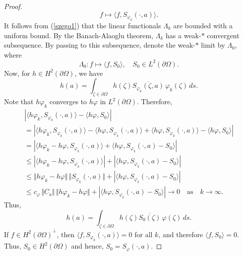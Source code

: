 \documentclass[11pt, reqno]{amsart}
\numberwithin{equation}{section}
\begin{document}
\begin{proof}
\[
f\mapsto \langle f, S_{\varphi_k}(\cdot,a)\rangle.
\]
It follows from (\ref{szego1}) that the linear functionals $\Lambda_k$ are bounded with a uniform bound. By the Banach-Alaoglu theorem, $\Lambda_k$ has a weak-${*}$ convergent subsequence. By passing to this subsequence, denote the weak-${*}$ limit by $\Lambda_0$, where 
\[
\Lambda_0: f\mapsto \langle f, S_0\rangle,\quad S_0\in L^2(\partial\Omega).
\]
Now, for $h\in H^2(\partial\Omega)$, we have
\[
h(a)=\int_{\zeta\in\partial\Omega} h(\zeta) \overline{S_{\varphi_k}(\zeta,a)}\,\varphi_k(\zeta)\,ds.
\]
Note that $h\varphi_k$ converges to $h\varphi$ in $L^2(\partial\Omega)$. Therefore,
\begin{multline*}
\left\lvert\langle h\varphi_k,S_{\varphi_k}(\cdot,a)\rangle-\langle h\varphi, S_0\rangle\right\rvert \\
= \left\lvert\langle h\varphi_k,S_{\varphi_k}(\cdot,a)\rangle-\langle h\varphi, S_{\varphi_k}(\cdot,a)\rangle+
\langle h\varphi, S_{\varphi_k}(\cdot,a)\rangle-\langle h\varphi, S_0\rangle\right\rvert\\
= \left\lvert\langle h\varphi_k-h\varphi, S_{\varphi_k}(\cdot,a)\rangle + \langle h\varphi,S_{\varphi_k}(\cdot,a)-S_0\rangle\right\rvert\\
\leq \left\lvert\langle h\varphi_k-h\varphi, S_{\varphi_k}(\cdot,a)\rangle\right\rvert + \left\lvert\langle h\varphi,S_{\varphi_k}(\cdot,a)-S_0\rangle\right\rvert\\
\leq \Vert h\varphi_k-h\varphi\Vert\,\Vert S_{\varphi_k}(\cdot,a)\Vert + \left\lvert\langle h\varphi,S_{\varphi_k}(\cdot,a)-S_0\rangle\right\rvert\\
\leq c_{\varphi}\,\Vert C_a\Vert\,\Vert h\varphi_k-h\varphi\Vert + \left\lvert\langle h\varphi,S_{\varphi_k}(\cdot,a)-S_0\rangle\right\rvert \rightarrow 0 \quad \text{as}\quad k\rightarrow\infty.
\end{multline*}
Thus,
\[
h(a)=\int_{\zeta\in\partial\Omega} h(\zeta) \overline{S_0(\zeta)}\,\varphi(\zeta)\,ds.
\]
If $f\in {H^2(\partial\Omega)}^{\perp}$, then $\langle f, S_{\varphi_k}(\cdot,a)\rangle=0$ for all $k$, and therefore $\langle f, S_0\rangle=0$. Thus, $S_0\in H^2(\partial\Omega)$ and hence, $S_0=S_{\varphi}(\cdot,a)$.

\smallskip


\end{proof}
\end{document}
